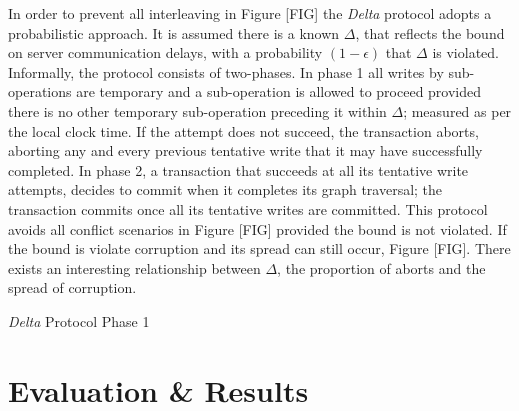 \documentclass[sigplan,screen]{acmart}
\begin{document}
In order to prevent all interleaving in Figure [FIG] the \emph{Delta} protocol adopts a probabilistic approach. It is assumed there is a known $\Delta$, that reflects the bound on server communication delays, with a probability $(1-\epsilon)$ that $\Delta$ is violated. Informally, the protocol consists of two-phases. In phase 1 all writes by sub-operations are temporary and a sub-operation is allowed to proceed provided there is no other temporary sub-operation preceding it within $\Delta$; measured as per the local clock time. If the attempt does not succeed, the transaction aborts, aborting any and every previous tentative write that it may have successfully completed. In phase 2, a transaction that succeeds at all its tentative write attempts, decides to commit when it completes its graph traversal; the transaction commits once all its tentative writes are committed. This protocol avoids all conflict scenarios in Figure [FIG] provided the bound is not violated. If the bound is violate corruption and its spread can still occur, Figure [FIG]. There exists an interesting relationship between $\Delta$, the proportion of aborts and the spread of corruption.

\begin{algorithm}
  \SetAlgoLined
    \caption{\emph{Delta} Protocol Phase 1}
\end{algorithm}

\section{Evaluation \& Results}

\end{document}
